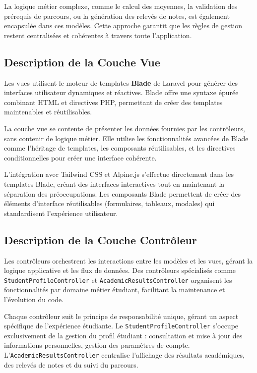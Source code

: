 \documentclass[12pt,a4paper]{report}
\begin{document}
La logique métier complexe, comme le calcul des moyennes, la validation des prérequis de parcours, ou la génération des relevés de notes, est également encapsulée dans ces modèles. Cette approche garantit que les règles de gestion restent centralisées et cohérentes à travers toute l'application.

\subsection{Description de la Couche Vue}

Les vues utilisent le moteur de templates \textbf{Blade} de Laravel pour générer des interfaces utilisateur dynamiques et réactives. Blade offre une syntaxe épurée combinant HTML et directives PHP, permettant de créer des templates maintenables et réutilisables.

La couche vue se contente de présenter les données fournies par les contrôleurs, sans contenir de logique métier. Elle utilise les fonctionnalités avancées de Blade comme l'héritage de templates, les composants réutilisables, et les directives conditionnelles pour créer une interface cohérente.

L'intégration avec Tailwind CSS et Alpine.js s'effectue directement dans les templates Blade, créant des interfaces interactives tout en maintenant la séparation des préoccupations. Les composants Blade permettent de créer des éléments d'interface réutilisables (formulaires, tableaux, modales) qui standardisent l'expérience utilisateur.

\subsection{Description de la Couche Contrôleur}

Les contrôleurs orchestrent les interactions entre les modèles et les vues, gérant la logique applicative et les flux de données. Des contrôleurs spécialisés comme \texttt{StudentProfileController} et \texttt{AcademicResultsController} organisent les fonctionnalités par domaine métier étudiant, facilitant la maintenance et l'évolution du code.

Chaque contrôleur suit le principe de responsabilité unique, gérant un aspect spécifique de l'expérience étudiante. Le \texttt{StudentProfileController} s'occupe exclusivement de la gestion du profil étudiant : consultation et mise à jour des informations personnelles, gestion des paramètres de compte. L'\texttt{AcademicResultsController} centralise l'affichage des résultats académiques, des relevés de notes et du suivi du parcours.
\end{document}
